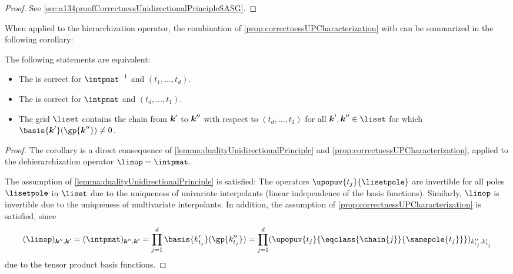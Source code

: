 \vspace{-0.5em}

\begin{proof}
  See \cref{sec:a134proofCorrectnessUnidirectionalPrincipleSASG}.
\end{proof}

\vspace{0.5em}

When applied to the hierarchization operator,
the combination of \cref{prop:correctnessUPCharacterization} with
 can be summarized in
the following corollary:

\begin{corollary}
  \label{cor:equivalentCorrectnessUPHierarchization}
  The following statements are equivalent:
  \begin{itemize}
    \item
    The \up is correct for $\intpmatinv$ and $(t_1, \dotsc, t_d)$.
    
    \item
    The \up is correct for $\intpmat$ and $(t_d, \dotsc, t_1)$.
    
    \item
    The grid $\liset$ contains the chain from ${\boldsymbol{k}}'$ to ${\boldsymbol{k}}''$
    with respect to $(t_d, \dotsc, t_1)$ for all $\*k', \*k'' \in \liset$
    for which $\basis{\*k'}(\gp{\*k''}) \not= 0$.
  \end{itemize}
\end{corollary}

\begin{proof}
  The corollary is a direct consequence of
  \cref{lemma:dualityUnidirectionalPrinciple} and
  \cref{prop:correctnessUPCharacterization},
  applied to the dehierarchization operator $\linop = \intpmat$.
  
  The assumption of \cref{lemma:dualityUnidirectionalPrinciple}
  is satisfied:
  The operators $\upopuv{t_j}{\lisetpole}$ are invertible
  for all poles $\lisetpole$ in $\liset$
  due to the uniqueness of univariate interpolants
  (linear independence of the basis functions).
  Similarly, $\linop$ is invertible
  due to the uniqueness of multivariate interpolants.
  In addition, the assumption of \cref{prop:correctnessUPCharacterization}
  is satisfied, since
  \begin{equation}
    (\linop)_{\*k'',\*k'}
    = (\intpmat)_{\*k'',\*k'}
    = \prod_{j=1}^d \basis{k'_{t_j}}(\gp{k''_{t_j}})
    = \prod_{j=1}^d
    (\upopuv{t_j}{\eqclass{\chain{j}}{\samepole{t_j}}})_{k''_{t_j},k'_{t_j}}
  \end{equation}
  due to the tensor product basis functions.
\end{proof}

